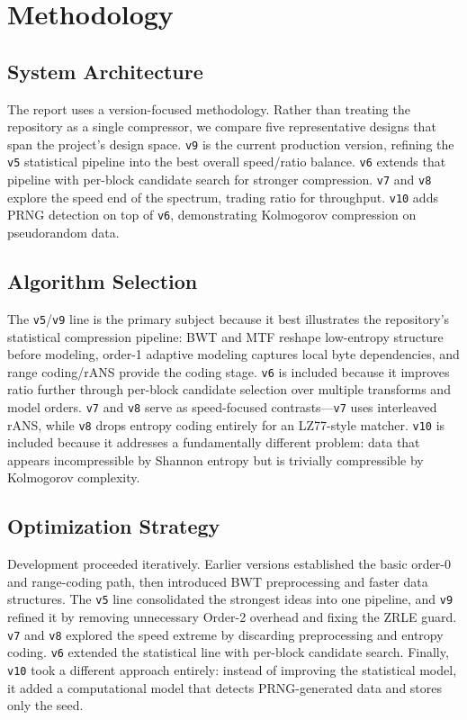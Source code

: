 \section{Methodology}
\label{sec:methodology}

\subsection{System Architecture}
The report uses a version-focused methodology. Rather than treating the repository as a single compressor, we compare five representative designs that span the project's design space. \texttt{v9} is the current production version, refining the \texttt{v5} statistical pipeline into the best overall speed/ratio balance. \texttt{v6} extends that pipeline with per-block candidate search for stronger compression. \texttt{v7} and \texttt{v8} explore the speed end of the spectrum, trading ratio for throughput. \texttt{v10} adds PRNG detection on top of \texttt{v6}, demonstrating Kolmogorov compression on pseudorandom data.

\subsection{Algorithm Selection}
The \texttt{v5}/\texttt{v9} line is the primary subject because it best illustrates the repository's statistical compression pipeline: BWT and MTF reshape low-entropy structure before modeling, order-1 adaptive modeling captures local byte dependencies, and range coding/rANS provide the coding stage. \texttt{v6} is included because it improves ratio further through per-block candidate selection over multiple transforms and model orders. \texttt{v7} and \texttt{v8} serve as speed-focused contrasts---\texttt{v7} uses interleaved rANS, while \texttt{v8} drops entropy coding entirely for an LZ77-style matcher. \texttt{v10} is included because it addresses a fundamentally different problem: data that appears incompressible by Shannon entropy but is trivially compressible by Kolmogorov complexity.

\subsection{Optimization Strategy}
Development proceeded iteratively. Earlier versions established the basic order-0 and range-coding path, then introduced BWT preprocessing and faster data structures. The \texttt{v5} line consolidated the strongest ideas into one pipeline, and \texttt{v9} refined it by removing unnecessary Order-2 overhead and fixing the ZRLE guard. \texttt{v7} and \texttt{v8} explored the speed extreme by discarding preprocessing and entropy coding. \texttt{v6} extended the statistical line with per-block candidate search. Finally, \texttt{v10} took a different approach entirely: instead of improving the statistical model, it added a computational model that detects PRNG-generated data and stores only the seed.

